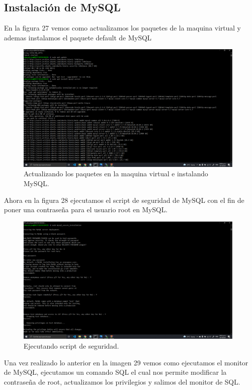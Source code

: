 \documentclass[11pt]{article}
\begin{document}
		\subsection{Instalación de MySQL}
		En la figura 27 vemos como actualizamos los paquetes de la maquina virtual y ademas instalamos el paquete default de MySQL
		\begin{figure}[H]
			\centering
			\includegraphics[scale=0.34]{resources/installandomysql.png}
			\caption{Actualizando los paquetes en la maquina virtual e instalando MySQL.}\label{fig:picture}
		\end{figure}
		Ahora en la figura 28 ejecutamos el script de seguridad de MySQL con el fin de poner una contraseña para el usuario root en MySQL.
		\begin{figure}[H]
			\centering
			\includegraphics[scale=0.34]{resources/MYSQL3.png}
			\caption{Ejecutando script de seguridad.}\label{fig:picture}
		\end{figure}
		Una vez realizado lo anterior en la imagen 29 vemos como ejecutamos el monitor de MySQL, ejecutamos un comando SQL el cual nos permite modificar la contraseña de root, actualizamos los privilegios y salimos del monitor de SQL.
\end{document}
